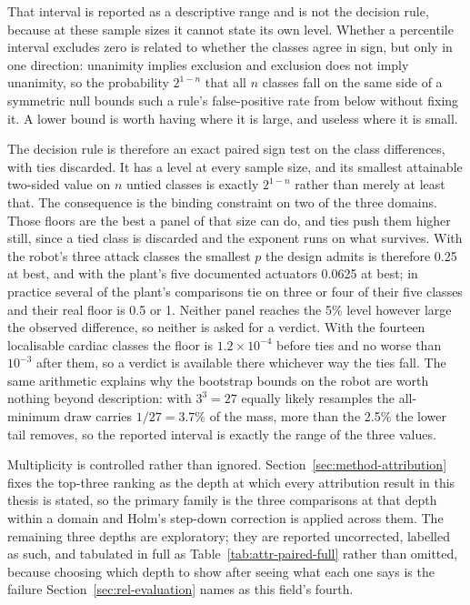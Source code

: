 That interval is reported as a descriptive range and is not the decision rule, because at these sample sizes it cannot state its own level. Whether a percentile interval excludes zero is related to whether the classes agree in sign, but only in one direction: unanimity implies exclusion and exclusion does not imply unanimity, so the probability $2^{1-n}$ that all $n$ classes fall on the same side of a symmetric null bounds such a rule's false-positive rate from below without fixing it. A lower bound is worth having where it is large, and useless where it is small.

The decision rule is therefore an exact paired sign test on the class differences, with ties discarded. It has a level at every sample size, and its smallest attainable two-sided value on $n$ untied classes is exactly $2^{1-n}$ rather than merely at least that. The consequence is the binding constraint on two of the three domains. Those floors are the best a panel of that size can do, and ties push them higher still, since a tied class is discarded and the exponent runs on what survives. With the robot's three attack classes the smallest $p$ the design admits is therefore 0.25 at best, and with the plant's five documented actuators 0.0625 at best; in practice several of the plant's comparisons tie on three or four of their five classes and their real floor is 0.5 or 1. Neither panel reaches the 5\% level however large the observed difference, so neither is asked for a verdict. With the fourteen localisable cardiac classes the floor is $1.2 \times 10^{-4}$ before ties and no worse than $10^{-3}$ after them, so a verdict is available there whichever way the ties fall. The same arithmetic explains why the bootstrap bounds on the robot are worth nothing beyond description: with $3^3 = 27$ equally likely resamples the all-minimum draw carries $1/27 = 3.7\%$ of the mass, more than the 2.5\% the lower tail removes, so the reported interval is exactly the range of the three values.

Multiplicity is controlled rather than ignored. Section~\ref{sec:method-attribution} fixes the top-three ranking as the depth at which every attribution result in this thesis is stated, so the primary family is the three comparisons at that depth within a domain and Holm's step-down correction is applied across them. The remaining three depths are exploratory; they are reported uncorrected, labelled as such, and tabulated in full as Table~\ref{tab:attr-paired-full} rather than omitted, because choosing which depth to show after seeing what each one says is the failure Section~\ref{sec:rel-evaluation} names as this field's fourth.
